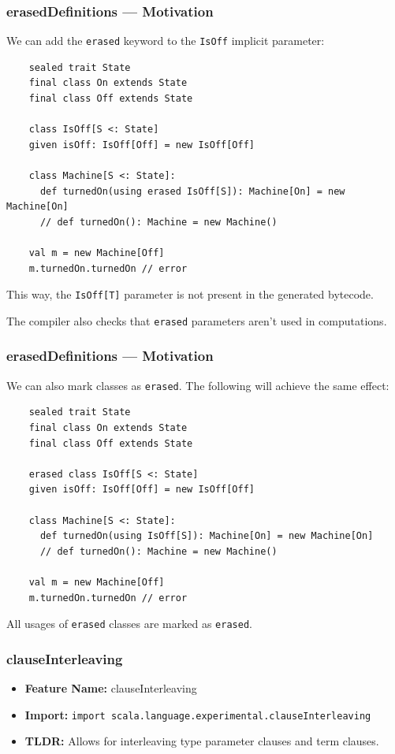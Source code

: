 \documentclass{beamer}
\begin{document}
\begin{frame}[fragile]
  \frametitle{erasedDefinitions --- Motivation}

  We can add the \texttt{erased} keyword to the \texttt{IsOff} implicit parameter:

  \begin{lstlisting}
    sealed trait State
    final class On extends State
    final class Off extends State
    
    class IsOff[S <: State]
    given isOff: IsOff[Off] = new IsOff[Off]
    
    class Machine[S <: State]:
      def turnedOn(using erased IsOff[S]): Machine[On] = new Machine[On]
      // def turnedOn(): Machine = new Machine()
    
    val m = new Machine[Off]
    m.turnedOn.turnedOn // error
  \end{lstlisting}

  \small
  This way, the \texttt{IsOff[T]} parameter is not present in the generated bytecode.

  The compiler also checks that \texttt{erased} parameters aren't used in computations.
  
\end{frame}

\begin{frame}[fragile]
  \frametitle{erasedDefinitions --- Motivation}

  We can also mark classes as \texttt{erased}. The following will achieve the same effect: 

  \begin{lstlisting}
    sealed trait State
    final class On extends State
    final class Off extends State
    
    erased class IsOff[S <: State]
    given isOff: IsOff[Off] = new IsOff[Off]
    
    class Machine[S <: State]:
      def turnedOn(using IsOff[S]): Machine[On] = new Machine[On]
      // def turnedOn(): Machine = new Machine()
    
    val m = new Machine[Off]
    m.turnedOn.turnedOn // error
  \end{lstlisting}

  All usages of \texttt{erased} classes are marked as \texttt{erased}.
  
\end{frame}

\begin{frame}[fragile]
  \frametitle{clauseInterleaving}
  \begin{itemize}
    \item \textbf{Feature Name:} clauseInterleaving
    \item \textbf{Import:} \texttt{import scala.language.experimental.clauseInterleaving}
    \item \textbf{TLDR:} Allows for interleaving type parameter clauses and term clauses.
  \end{itemize}
\end{frame}
\end{document}
